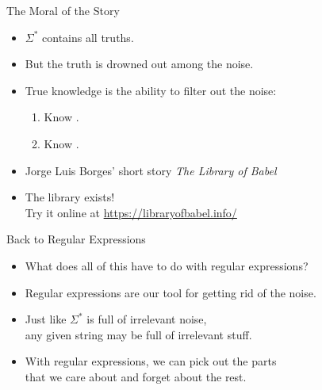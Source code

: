 \documentclass[professionalfonts, xcolor={usenames,svgnames,x11names,table}]{beamer}
\begin{document}
\begin{frame}{The Moral of the Story}
    \begin{itemize}
        \item $\Sigma^*$ contains all truths.
        \item But the truth is drowned out among the noise.
        \item True knowledge is the ability to filter out the noise:
            \begin{enumerate}
                \item Know .
                \item Know .
            \end{enumerate}
    \end{itemize}

    \begin{followup}
        \begin{itemize}
            \item Jorge Luis Borges' short story \emph{The Library of Babel}
            \item The library exists!\\
                  Try it online at \url{https://libraryofbabel.info/}
        \end{itemize}
    \end{followup}
\end{frame}

\begin{frame}{Back to Regular Expressions}
    \begin{itemize}
        \item What does all of this have to do with regular expressions?
        \item Regular expressions are our tool for getting rid of the noise.
        \item Just like $\Sigma^*$ is full of irrelevant noise,\\
              any given string may be full of irrelevant stuff. 
        \item With regular expressions, we can pick out the parts\\
            that we care about and forget about the rest.
    \end{itemize}
\end{frame}
\end{document}
